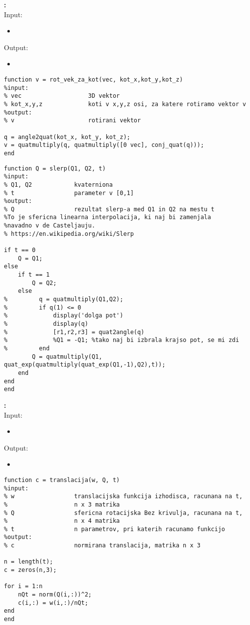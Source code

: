 \documentclass[12pt,a4paper,twoside]{article}
\theoremstyle{definition} %
\theoremstyle{plain} %
\numberwithin{equation}{section}  %
\begin{document}
\textbf{:}\\
Input:
\begin{itemize}
\item 
\end{itemize}
Output:
\begin{itemize}
\item 
\end{itemize}

\begin{lstlisting}[caption = {\color{green} rot\_vek\_za\_kot}]
function v = rot_vek_za_kot(vec, kot_x,kot_y,kot_z)
%input:
% vec                   3D vektor
% kot_x,y,z             koti v x,y,z osi, za katere rotiramo vektor v
%output:
% v                     rotirani vektor

q = angle2quat(kot_x, kot_y, kot_z);
v = quatmultiply(q, quatmultiply([0 vec], conj_quat(q)));
end
\end{lstlisting}

\begin{lstlisting}[caption = {\color{green} slerp}]
function Q = slerp(Q1, Q2, t)
%input:
% Q1, Q2            kvaterniona
% t                 parameter v [0,1]
%output:
% Q                 rezultat slerp-a med Q1 in Q2 na mestu t
%To je sfericna linearna interpolacija, ki naj bi zamenjala
%navadno v de Casteljauju.
% https://en.wikipedia.org/wiki/Slerp

if t == 0
    Q = Q1;
else
    if t == 1
        Q = Q2;
    else
%         q = quatmultiply(Q1,Q2);
%         if q(1) <= 0 
%             display('dolga pot')
%             display(q)
%             [r1,r2,r3] = quat2angle(q)
%             %Q1 = -Q1; %tako naj bi izbrala krajso pot, se mi zdi 
%         end
        Q = quatmultiply(Q1, quat_exp(quatmultiply(quat_exp(Q1,-1),Q2),t));
    end
end
end
\end{lstlisting}

\textbf{:}\\
Input:
\begin{itemize}
\item 
\end{itemize}
Output:
\begin{itemize}
\item 
\end{itemize}

\begin{lstlisting}[caption = {\color{green} translacija}]
function c = translacija(w, Q, t)
%input:
% w                 translacijska funkcija izhodisca, racunana na t,
%                   n x 3 matrika
% Q                 sfericna rotacijska Bez krivulja, racunana na t,
%                   n x 4 matrika
% t                 n parametrov, pri katerih racunamo funkcijo
%output:
% c                 normirana translacija, matrika n x 3

n = length(t);
c = zeros(n,3);

for i = 1:n
    nQt = norm(Q(i,:))^2;
    c(i,:) = w(i,:)/nQt;
end
end
\end{lstlisting}
\end{document}
